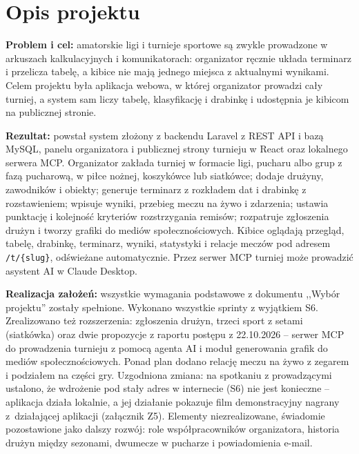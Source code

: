 \documentclass[11pt,a4paper,oneside]{article}
\newif\ifpodpowiedzi
\newcommand{\podpowiedz}[1]{\ifpodpowiedzi\par\begingroup\small\color{hintcolor}\textit{Wskazówka: #1}\par\endgroup\fi}
\begin{document}
\tableofcontents
\sloppy
\podpowiedz{Sprawozdanie podsumowuje cały projekt. Opisz uzyskane rezultaty, zgodność z uzgodnionym zakresem i indywidualny wkład. Szczegóły techniczne możesz wskazać przez odwołania do osobnej dokumentacji. Uzupełnij wszystkie pola, usuń przykłady i wyłącz podpowiedzi przed oddaniem. Dla zespołu dwuosobowego zatwierdzonego przez dyrekcję użyj przełącznika w preambule i usuń opis prac trzeciej osoby.}

\section{Opis projektu}
\podpowiedz{Przedstaw problem, cel, odbiorców oraz finalny rezultat. Wyjaśnij praktyczny i inżynierski charakter projektu. Porównaj rezultat z dokumentem ,,Wybór projektu'', uwzględniając późniejsze uzgodnienia.}
\textbf{Problem i cel:} amatorskie ligi i turnieje sportowe są zwykle prowadzone w arkuszach kalkulacyjnych i komunikatorach: organizator ręcznie układa terminarz i przelicza tabelę, a kibice nie mają jednego miejsca z aktualnymi wynikami. Celem projektu była aplikacja webowa, w której organizator prowadzi cały turniej, a system sam liczy tabelę, klasyfikację i drabinkę i udostępnia je kibicom na publicznej stronie.\par
\textbf{Rezultat:} powstał system złożony z backendu Laravel z REST API i bazą MySQL, panelu organizatora i publicznej strony turnieju w React oraz lokalnego serwera MCP. Organizator zakłada turniej w formacie ligi, pucharu albo grup z fazą pucharową, w piłce nożnej, koszykówce lub siatkówce; dodaje drużyny, zawodników i obiekty; generuje terminarz z rozkładem dat i drabinkę z rozstawieniem; wpisuje wyniki, przebieg meczu na żywo i zdarzenia; ustawia punktację i kolejność kryteriów rozstrzygania remisów; rozpatruje zgłoszenia drużyn i tworzy grafiki do mediów społecznościowych. Kibice oglądają przegląd, tabelę, drabinkę, terminarz, wyniki, statystyki i relacje meczów pod adresem \texttt{/t/\{slug\}}, odświeżane automatycznie. Przez serwer MCP turniej może prowadzić asystent AI w Claude Desktop.\par
\textbf{Realizacja założeń:} wszystkie wymagania podstawowe z dokumentu ,,Wybór projektu'' zostały spełnione. Wykonano wszystkie sprinty z wyjątkiem S6. Zrealizowano też rozszerzenia: zgłoszenia drużyn, trzeci sport z setami (siatkówka) oraz dwie propozycje z raportu postępu z 22.10.2026 -- serwer MCP do prowadzenia turnieju z pomocą agenta AI i moduł generowania grafik do mediów społecznościowych. Ponad plan dodano relację meczu na żywo z zegarem i podziałem na części gry. Uzgodniona zmiana: na spotkaniu z prowadzącymi ustalono, że wdrożenie pod stały adres w internecie (S6) nie jest konieczne -- aplikacja działa lokalnie, a jej działanie pokazuje film demonstracyjny nagrany z~działającej aplikacji (załącznik Z5). Elementy niezrealizowane, świadomie pozostawione jako dalszy rozwój: role współpracowników organizatora, historia drużyn między sezonami, dwumecze w pucharze i powiadomienia e-mail.
\end{document}
